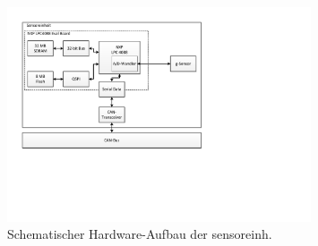 \begin{figure}
	\centering
		\includegraphics[width=0.8\textwidth]{images/visio/hardware_sensor.pdf}
	\caption{Schematischer Hardware-Aufbau der \gls{sensoreinh}.}
	\label{fig.hw_sensor}
\end{figure}

